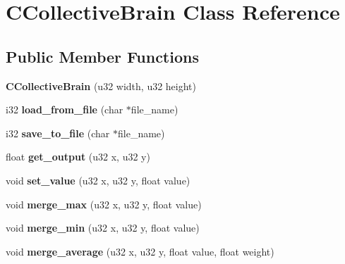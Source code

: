 \hypertarget{classCCollectiveBrain}{\section{C\-Collective\-Brain Class Reference}
\label{classCCollectiveBrain}
}
\subsection*{Public Member Functions}
\begin{DoxyCompactItemize}
\item 
\hypertarget{classCCollectiveBrain_a7c6dd4860455a539d8107cb4e6cde0a8}{{\bfseries C\-Collective\-Brain} (u32 width, u32 height)}\label{classCCollectiveBrain_a7c6dd4860455a539d8107cb4e6cde0a8}

\item 
\hypertarget{classCCollectiveBrain_a8767e026138fee50709281f11bfb9fcb}{i32 {\bfseries load\-\_\-from\-\_\-file} (char $\ast$file\-\_\-name)}\label{classCCollectiveBrain_a8767e026138fee50709281f11bfb9fcb}

\item 
\hypertarget{classCCollectiveBrain_ad73e195c1ae9a7e4a27da1809d8bd976}{i32 {\bfseries save\-\_\-to\-\_\-file} (char $\ast$file\-\_\-name)}\label{classCCollectiveBrain_ad73e195c1ae9a7e4a27da1809d8bd976}

\item 
\hypertarget{classCCollectiveBrain_aa4ac7fb568f2b32d3447de85ed4e3ffc}{float {\bfseries get\-\_\-output} (u32 x, u32 y)}\label{classCCollectiveBrain_aa4ac7fb568f2b32d3447de85ed4e3ffc}

\item 
\hypertarget{classCCollectiveBrain_a5336b7b533338ae3cb26a8acea9745b4}{void {\bfseries set\-\_\-value} (u32 x, u32 y, float value)}\label{classCCollectiveBrain_a5336b7b533338ae3cb26a8acea9745b4}

\item 
\hypertarget{classCCollectiveBrain_a8d9856fb8e5e2dc8eaf0e9a069566524}{void {\bfseries merge\-\_\-max} (u32 x, u32 y, float value)}\label{classCCollectiveBrain_a8d9856fb8e5e2dc8eaf0e9a069566524}

\item 
\hypertarget{classCCollectiveBrain_a7e7f9bd67383dd58a62493f8ccc48077}{void {\bfseries merge\-\_\-min} (u32 x, u32 y, float value)}\label{classCCollectiveBrain_a7e7f9bd67383dd58a62493f8ccc48077}

\item 
\hypertarget{classCCollectiveBrain_aa7f35d24b962fd0c400a90bc864328e2}{void {\bfseries merge\-\_\-average} (u32 x, u32 y, float value, float weight)}\label{classCCollectiveBrain_aa7f35d24b962fd0c400a90bc864328e2}


\end{DoxyCompactItemize}
